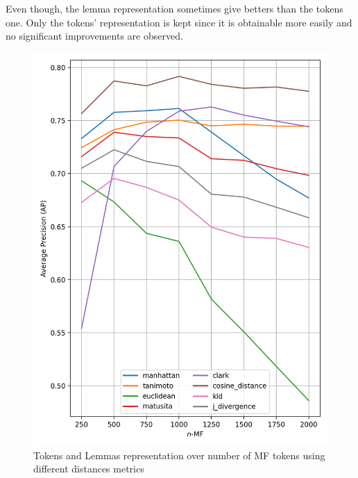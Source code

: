Even though, the lemma representation sometimes give betters than the tokens one.
Only the tokens' representation is kept since it is obtainable more easily and no significant improvements are observed.

\begin{figure}
  \centering
  \caption{Tokens and Lemmas representation over number of MF tokens using different distances metrics}
  \label{fig:tokens_lemmas}

  \label{fig:tokens}
  \includegraphics[width=0.9\linewidth]{img/mf_tokens.png}

  \vspace{0.5cm}


\end{figure}
